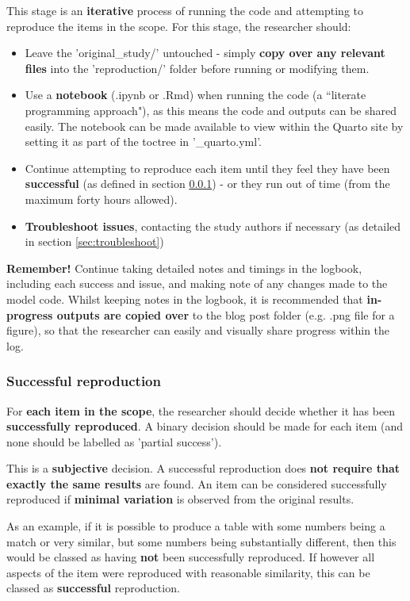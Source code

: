 This stage is an \textbf{iterative} process of running the code and attempting to reproduce the items in the scope. For this stage, the researcher should:
\begin{itemize}
    \item Leave the 'original\_study/' untouched - simply \textbf{copy over any relevant files} into the 'reproduction/' folder before running or modifying them.
    \item Use a \textbf{notebook} (.ipynb or .Rmd) when running the code (a ``literate programming approach"), as this means the code and outputs can be shared easily. The notebook can be made available to view within the Quarto site by setting it as part of the toctree in '\_quarto.yml'.
    \item Continue attempting to reproduce each item until they feel they have been \textbf{successful} (as defined in section \ref{sec:success}) - or they run out of time (from the maximum forty hours allowed).
    \item \textbf{Troubleshoot issues}, contacting the study authors if necessary (as detailed in section \ref{sec:troubleshoot})
\end{itemize}

\textbf{Remember!} Continue taking detailed notes and timings in the logbook, including each success and issue, and making note of any changes made to the model code. Whilst keeping notes in the logbook, it is recommended that \textbf{in-progress outputs are copied over} to the blog post folder (e.g. .png file for a figure), so that the researcher can easily and visually share progress within the log.

\vspace{0.5cm}
\subsubsection{Successful reproduction} \label{sec:success}

For \textbf{each item in the scope}, the researcher should decide whether it has been \textbf{successfully reproduced}. A binary decision should be made for each item (and none should be labelled as 'partial success').

This is a \textbf{subjective} decision. A successful reproduction does \textbf{not require that exactly the same results} are found. An item can be considered successfully reproduced if \textbf{minimal variation} is observed from the original results.

As an example, if it is possible to produce a table with some numbers being a match or very similar, but some numbers being substantially different, then this would be classed as having \textbf{not} been successfully reproduced. If however all aspects of the item were reproduced with reasonable similarity, this can be classed as \textbf{successful} reproduction.

